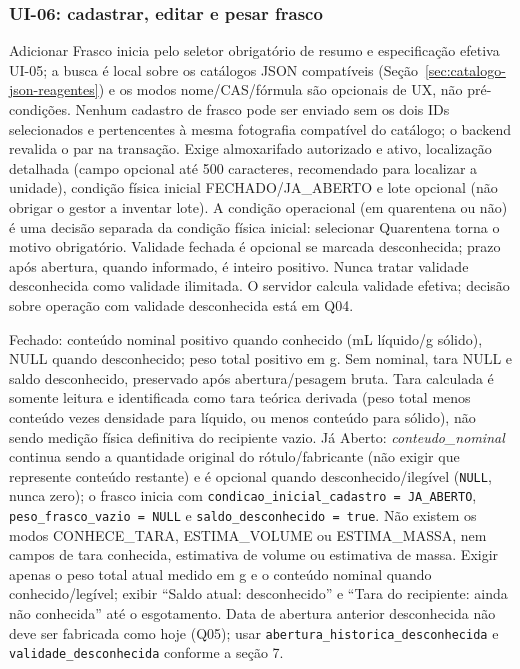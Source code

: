 \subsubsection{UI-06: cadastrar, editar e pesar frasco}
Adicionar Frasco inicia pelo seletor obrigatório de resumo e especificação efetiva UI-05; a busca é local sobre os catálogos JSON compatíveis (Seção~\ref{sec:catalogo-json-reagentes}) e os modos nome/CAS/fórmula são opcionais de UX, não pré-condições. Nenhum cadastro de frasco pode ser enviado sem os dois IDs selecionados e pertencentes à mesma fotografia compatível do catálogo; o backend revalida o par na transação. Exige almoxarifado autorizado e ativo, localização detalhada (campo opcional até 500 caracteres, recomendado para localizar a unidade), condição física inicial FECHADO/JA\_ABERTO e lote opcional (não obrigar o gestor a inventar lote). A condição operacional (em quarentena ou não) é uma decisão separada da condição física inicial: selecionar Quarentena torna o motivo obrigatório. Validade fechada é opcional se marcada desconhecida; prazo após abertura, quando informado, é inteiro positivo. Nunca tratar validade desconhecida como validade ilimitada. O servidor calcula validade efetiva; decisão sobre operação com validade desconhecida está em Q04.

Fechado: conteúdo nominal positivo quando conhecido (mL líquido/g sólido), NULL quando desconhecido; peso total positivo em g. Sem nominal, tara NULL e saldo desconhecido, preservado após abertura/pesagem bruta. Tara calculada é somente leitura e identificada como tara teórica derivada (peso total menos conteúdo vezes densidade para líquido, ou menos conteúdo para sólido), não sendo medição física definitiva do recipiente vazio. Já Aberto: \textit{conteudo\_nominal} continua sendo a quantidade original do rótulo/fabricante (não exigir que represente conteúdo restante) e é opcional quando desconhecido/ilegível (\texttt{NULL}, nunca zero); o frasco inicia com \texttt{condicao\_inicial\_cadastro = JA\_ABERTO}, \texttt{peso\_frasco\_vazio = NULL} e \texttt{saldo\_desconhecido = true}. Não existem os modos CONHECE\_TARA, ESTIMA\_VOLUME ou ESTIMA\_MASSA, nem campos de tara conhecida, estimativa de volume ou estimativa de massa. Exigir apenas o peso total atual medido em g e o conteúdo nominal quando conhecido/legível; exibir ``Saldo atual: desconhecido'' e ``Tara do recipiente: ainda não conhecida'' até o esgotamento. Data de abertura anterior desconhecida não deve ser fabricada como hoje (Q05); usar \texttt{abertura\_historica\_desconhecida} e \texttt{validade\_desconhecida} conforme a seção 7.

